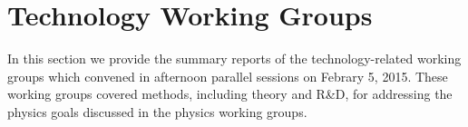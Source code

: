 \section{Technology Working Groups}
\label{sec:TechnologyWG}

In this section we provide the summary reports of the
technology-related working groups which convened in afternoon
parallel sessions on Febrary 5, 2015. These working groups covered
methods, including theory and R\&D, for addressing the physics goals
discussed in the physics working groups.


